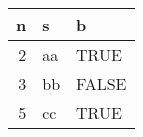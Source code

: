 \begin{tabular}{r|l|l}
\hline
n & s & b\\
\hline
2 & aa & TRUE\\
\hline
3 & bb & FALSE\\
\hline
5 & cc & TRUE\\
\hline
\end{tabular}
